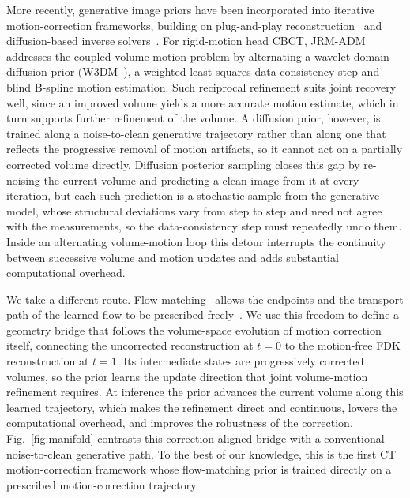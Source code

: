 \documentclass[11pt]{article}
\begin{document}
More recently, generative image priors have been incorporated into iterative
motion-correction frameworks, building on plug-and-play reconstruction~\cite{pnp13} and
diffusion-based inverse solvers~\cite{dds24}. For rigid-motion head CBCT,
JRM-ADM~\cite{depaepe25} addresses the coupled volume-motion problem by alternating a
wavelet-domain diffusion prior (W3DM~\cite{wdm24}), a weighted-least-squares
data-consistency step and blind B-spline motion estimation. Such reciprocal refinement
suits joint recovery well, since an improved volume yields a more accurate motion estimate,
which in turn supports further refinement of the volume. A diffusion prior, however, is
trained along a noise-to-clean generative trajectory rather than along one that reflects
the progressive removal of motion artifacts, so it cannot act on a partially corrected
volume directly. Diffusion posterior sampling closes this gap by re-noising the current
volume and predicting a clean image from it at every iteration, but each such prediction
is a stochastic sample from the generative model, whose structural deviations vary from
step to step and need not agree with the measurements, so the data-consistency step must
repeatedly undo them. Inside an alternating volume-motion loop this detour interrupts the
continuity between successive volume and motion updates and adds substantial
computational overhead.

We take a different route. Flow matching~\cite{lipman23} allows the endpoints and the
transport path of the learned flow to be prescribed
freely~\cite{indi23,albergo23,i2sb23}. We use this freedom to define a geometry bridge that
follows the volume-space evolution of motion correction itself, connecting the uncorrected
reconstruction at $t{=}0$ to the motion-free FDK reconstruction at $t{=}1$. Its intermediate
states are progressively corrected volumes, so the prior learns the update direction that
joint volume-motion refinement requires. At inference the prior advances the current
volume along this learned trajectory, which makes the refinement direct and continuous,
lowers the computational overhead, and improves the robustness of the correction.
Fig.~\ref{fig:manifold} contrasts this correction-aligned bridge with a conventional
noise-to-clean generative path. To the best of our knowledge, this is the first CT
motion-correction framework whose flow-matching prior is trained directly on a prescribed
motion-correction trajectory.
\end{document}

